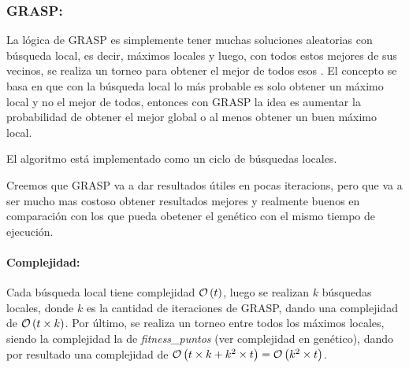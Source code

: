 \subsubsection{GRASP:}


La lógica de GRASP es simplemente tener muchas soluciones aleatorias con
búsqueda local, es decir, máximos locales y luego, con todos estos mejores de
sus vecinos, se realiza un torneo para obtener el mejor de todos esos . El
concepto se basa en que con la búsqueda local lo más probable es solo obtener un
máximo local y no el mejor de todos, entonces con GRASP la idea es aumentar la
probabilidad de obtener el mejor global o al menos obtener un buen máximo local.

El algoritmo está implementado como un ciclo de búsquedas locales.

Creemos que GRASP va a dar resultados útiles en pocas iteracions, pero que va a
ser mucho mas costoso obtener resultados mejores y realmente buenos en
comparación con los que pueda obetener el genético con el mismo tiempo de
ejecución.

\paragraph{Complejidad:} Cada búsqueda local tiene complejidad $\mathcal{O}\left(t\right)$, luego
se realizan $k$ búsquedas locales, donde $k$ es la cantidad de iteraciones de
GRASP, dando una complejidad de $\mathcal{O}\left(t\times k\right)$. Por último, se realiza un
torneo entre todos los máximos locales, siendo la complejidad la de {\it
  fitness\_puntos} (ver complejidad en genético), dando por resultado una
complejidad de $\mathcal{O}\left(t\times k + k^2\times t\right) = \mathcal{O}\left(k^2\times t\right)$.
